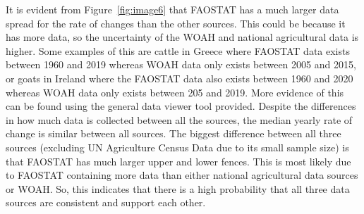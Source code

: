 \documentclass{article}
\begin{document}
It is evident from Figure~\ref{fig:image6} that FAOSTAT has a much larger data spread for the rate of changes than the other sources. This could be because it has more data, so the uncertainty of the WOAH and national agricultural data is higher. Some examples of this are cattle in Greece where FAOSTAT data exists between 1960 and 2019 whereas WOAH data only exists between 2005 and 2015, or goats in Ireland where the FAOSTAT data also exists between 1960 and 2020 whereas WOAH data only exists between 205 and 2019. More evidence of this can be found using the general data viewer tool provided. Despite the differences in how much data is collected between all the sources, the median yearly rate of change is similar between all sources. 
The biggest difference between all three sources (excluding UN Agriculture Census Data due to its small sample size) is that FAOSTAT has much larger upper and lower fences. This is most likely due to FAOSTAT containing more data than either national agricultural data sources or WOAH. So, this indicates that there is a high probability that all three data sources are consistent and support each other. 
\end{document}
